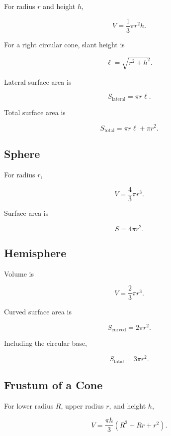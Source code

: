 For radius \(r\) and height \(h\),

\[
\boxed{
V
=
\frac13\pi r^2h.
}
\]

For a right circular cone, slant height is

\[
\boxed{
\ell
=
\sqrt{r^2+h^2}.
}
\]

Lateral surface area is

\[
\boxed{
S_{\mathrm{lateral}}
=
\pi r\ell.
}
\]

Total surface area is

\[
\boxed{
S_{\mathrm{total}}
=
\pi r\ell+\pi r^2.
}
\]

\subsection{Sphere}
\label{subsec:sphere-formulas}

For radius \(r\),

\[
\boxed{
V
=
\frac43\pi r^3.
}
\]

Surface area is

\[
\boxed{
S
=
4\pi r^2.
}
\]

\subsection{Hemisphere}
\label{subsec:hemisphere-formulas}

Volume is

\[
\boxed{
V
=
\frac23\pi r^3.
}
\]

Curved surface area is

\[
\boxed{
S_{\mathrm{curved}}
=
2\pi r^2.
}
\]

Including the circular base,

\[
\boxed{
S_{\mathrm{total}}
=
3\pi r^2.
}
\]

\subsection{Frustum of a Cone}
\label{subsec:cone-frustum-formulas}

For lower radius \(R\), upper radius \(r\), and height \(h\),

\[
\boxed{
V
=
\frac{\pi h}{3}
\left(
R^2+Rr+r^2
\right).
}
\]

